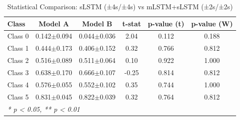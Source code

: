 \begin{table}[htbp]
\centering
\caption{Statistical Comparison: sLSTM (±4s/±4s) vs mLSTM+sLSTM (±2s/±2s)}
\label{tab:comparison_class_slstm_±4s_±4s_vs_mlstmslstm_±2s_±2s}
\begin{tabular}{lccccc}
\toprule
\textbf{Class} & \textbf{Model A} & \textbf{Model B} & \textbf{t-stat} & \textbf{p-value (t)} & \textbf{p-value (W)} \\
\midrule
Class 0 & 0.142$\pm$0.094 & 0.044$\pm$0.036 & 2.04 & 0.112 & 0.188 \\
Class 1 & 0.444$\pm$0.173 & 0.406$\pm$0.152 & 0.32 & 0.766 & 0.812 \\
Class 2 & 0.516$\pm$0.089 & 0.511$\pm$0.064 & 0.10 & 0.922 & 1.000 \\
Class 3 & 0.638$\pm$0.170 & 0.666$\pm$0.107 & -0.25 & 0.814 & 0.812 \\
Class 4 & 0.576$\pm$0.055 & 0.552$\pm$0.102 & 0.35 & 0.744 & 1.000 \\
Class 5 & 0.831$\pm$0.045 & 0.822$\pm$0.039 & 0.32 & 0.764 & 0.812 \\
\bottomrule
\multicolumn{6}{l}{\textit{* p < 0.05, ** p < 0.01}} \\
\end{tabular}
\end{table}